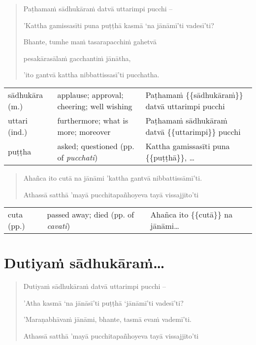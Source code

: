\documentclass[11pt,oneside]{memoir}
\begin{document}
\begin{quote}
Paṭhamaṁ sādhukāraṁ datvā uttarimpi pucchi --

'Kattha gamissasīti puna puṭṭhā kasmā `na jānāmī'ti vadesī'ti?

Bhante, tumhe maṁ tasarapacchiṁ gahetvā

pesakārasālaṁ gacchantiṁ jānātha,

'ito gantvā kattha nibbattissasī'ti pucchatha.
\end{quote}

\begin{longtable}{L{\colOne} L{\colTwo} H}
sādhukāra (m.) & applause; approval; cheering; well wishing & Paṭhamaṁ \{\{sādhukāraṁ\}\} datvā uttarimpi pucchi\\[0pt]
uttari (ind.) & furthermore; what is more; moreover & Paṭhamaṁ sādhukāraṁ datvā \{\{uttarimpi\}\} pucchi\\[0pt]
puṭṭha & asked; questioned (pp. of \emph{pucchati}) & Kattha gamissasīti puna \{\{puṭṭhā\}\}, \ldots{}\\[0pt]
\end{longtable}


\clearpage

\begin{quote}
Ahañca ito cutā na jānāmi 'kattha gantvā nibbattissāmī'ti.

Athassā satthā 'mayā pucchitapañhoyeva tayā vissajjito'ti
\end{quote}

\begin{longtable}{L{\colOne} L{\colTwo} H}
cuta (pp.) & passed away; died (pp. of \emph{cavati}) & Ahañca ito \{\{cutā\}\} na jānāmi\ldots{}\\[0pt]
\end{longtable}


\clearpage

\section{Dutiyaṁ sādhukāraṁ\ldots{}}
\label{sec:org69e31a2}

\begin{quote}
Dutiyaṁ sādhukāraṁ datvā uttarimpi pucchi –

'Atha kasmā `na jānāsī'ti puṭṭhā `jānāmī'ti vadesī'ti?

'Maraṇabhāvaṁ jānāmi, bhante, tasmā evaṁ vademī'ti.

Athassā satthā 'mayā pucchitapañhoyeva tayā vissajjito'ti
\end{quote}
\end{document}
